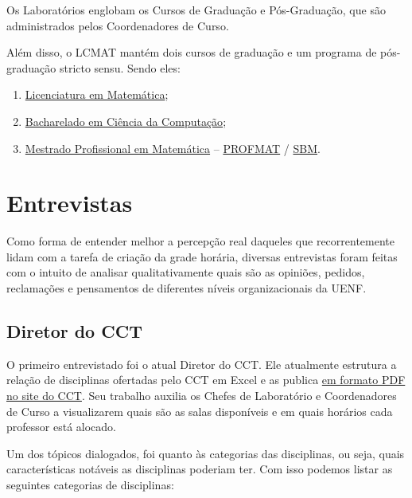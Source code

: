 Os Laboratórios englobam os Cursos de Graduação e Pós-Graduação, que são administrados pelos Coordenadores de Curso.

Além disso, o LCMAT mantém dois cursos de graduação e um programa de pós-graduação stricto sensu. Sendo eles:

\begin{enumerate}
  \item \href{https://uenf.br/posgraduacao/licenciatura-matematica/}{Licenciatura em Matemática};
  \item \href{https://cc.uenf.br/}{Bacharelado em Ciência da Computação};
  \item \href{https://uenf.br/posgraduacao/matematica/apresentacao/}{Mestrado Profissional em Matemática} – \href{https://uenf.br/posgraduacao/programas/pos-graduacao-stricto-sensu/}{PROFMAT} / \href{https://www.profmat-sbm.org.br/}{SBM}.
\end{enumerate}

\section{Entrevistas} \label{sec:entrevistas} %


Como forma de entender melhor a percepção real daqueles que recorrentemente lidam com a tarefa de criação da grade horária, diversas entrevistas foram feitas com o intuito de analisar qualitativamente quais são as opiniões, pedidos, reclamações e pensamentos de diferentes níveis organizacionais da UENF.

\subsection{Diretor do CCT} %


O primeiro entrevistado foi o atual Diretor do CCT. Ele atualmente estrutura a relação de disciplinas ofertadas pelo CCT em Excel e as publica \href{https://uenf.br/cct/secretaria-academica/distribuicao-das-salas-de-aula-do-cct/}{em formato PDF no site do CCT}. Seu trabalho auxilia os Chefes de Laboratório e Coordenadores de Curso a visualizarem quais são as salas disponíveis e em quais horários cada professor está alocado.

Um dos tópicos dialogados, foi quanto às categorias das disciplinas, ou seja, quais características notáveis as disciplinas poderiam ter. Com isso podemos listar as seguintes categorias de disciplinas:

